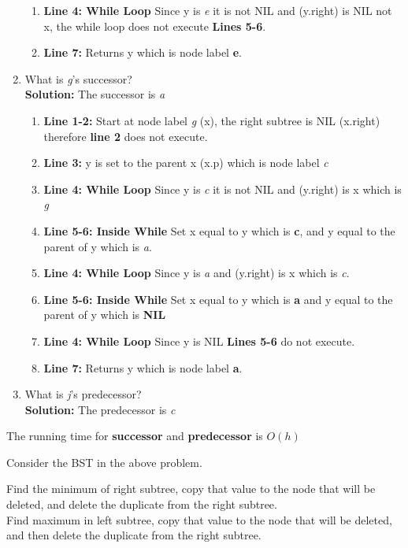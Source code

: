 \documentclass[11pt,fleqn]{book}
\begin{document}
\begin{enumerate}[label=(\Alph*)]
\begin{enumerate}
        \item \textbf{Line 4: While Loop} Since y is \textit{e} it is not NIL and (y.right) is NIL not x, the while loop does not execute \textbf{Lines 5-6}.
        \item \textbf{Line 7:} Returns y which is node label \textbf{e}.
    \end{enumerate}
    \item What is \textit{g}'s successor?\\
    \textbf{Solution: } The successor is \textit{a}
    \begin{enumerate}
        \item \textbf{Line 1-2:} Start at node label \textit{g} (x), the right subtree  is NIL (x.right) therefore \textbf{line 2} does not execute. 
        \item \textbf{Line 3:} y is set to the parent x (x.p) which is node label \textit{c} 
        \item \textbf{Line 4: While Loop} Since y is \textit{c} it is not NIL and (y.right) is x which is \textit{g} 
        \item \textbf{Line 5-6: Inside While } Set x equal to y which is \textbf{c}, and y equal to the parent of y which is \textit{a}. 
        \item \textbf{Line 4: While Loop} Since y is \textit{a} and (y.right) is x which is \textit{c}. 
        \item \textbf{Line 5-6: Inside While} Set x equal to y which is \textbf{a} and y equal to the parent of y which is \textbf{NIL}
        \item \textbf{Line 4: While Loop} Since y is NIL \textbf{Lines 5-6} do not execute. 
        \item \textbf{Line 7: } Returns y which is node label \textbf{a}.
    \end{enumerate}
    \item What is \textit{j}'s predecessor?\\
    \textbf{Solution: } The predecessor is \textit{c}
\end{enumerate}
\begin{remark}
The running time for \textbf{successor} and \textbf{predecessor} is $O(h)$
\end{remark}
\begin{example}
Consider the BST in the above problem. 
\end{example}
\begin{definition}
Find the minimum of right subtree, copy that value to the node that will be deleted, and delete the duplicate from the right subtree. \\
Find maximum in left subtree, copy that value to the node that will be deleted, and then delete the duplicate from the right subtree. 
\end{definition}
\end{document}
